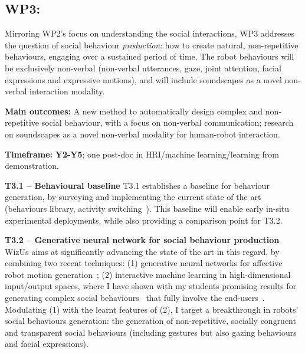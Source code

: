\documentclass[11pt,a4paper]{report}
\newcommand{\project}{WizUs\xspace}
\begin{document}
\subsection{WP3: \textbf{\wpThree}} 

Mirroring WP2's focus on understanding the social interactions, WP3 addresses the
question of social behaviour \emph{production}: how to create natural,
non-repetitive behaviours, engaging over a sustained period of time. The robot
behaviours will be exclusively non-verbal (non-verbal utterances, gaze, joint
attention, facial expressions and expressive motions), and will include
soundscapes as a novel non-verbal interaction modality.

\begin{framed}

    \textbf{Main outcomes:} A new method to automatically design complex and
    non-repetitive social behaviour, with a focus on non-verbal communication;
    research on soundscapes as a novel non-verbal modality for human-robot
    interaction.

    \textbf{Timeframe:} \textbf{Y2-Y5}; one post-doc in HRI/machine learning/learning from
demonstration.

\end{framed}

\textbf{T3.1 -- Behavioural baseline} T3.1 establishes a baseline for behaviour
generation, by surveying and implementing the current state of the art
(behaviours library, activity switching~\cite{coninx2016towards}). This
baseline will enable early in-situ experimental deployments, while also
providing a comparison point for T3.2.

\textbf{T3.2 -- Generative neural network for social behaviour production}
\project aims at significantly advancing the state of the art in this regard, by
combining two recent techniques: (1) generative neural networks for affective
robot motion generation~\cite{marmpena2019generating,suguitan2020moveae}; (2) interactive machine
learning in high-dimensional input/output spaces, where I have shown with my
students promising results for generating complex social
behaviours~\cite{senft2019teaching, winkle2020couch} that fully involve the
end-users~\cite{winkle2018social}. Modulating (1) with the learnt features of
(2), I target a breakthrough in robots' social behaviours generation: the
generation of non-repetitive, socially congruent and transparent social
behaviours (including gestures but also gazing behaviours and facial
expressions).
\end{document}
